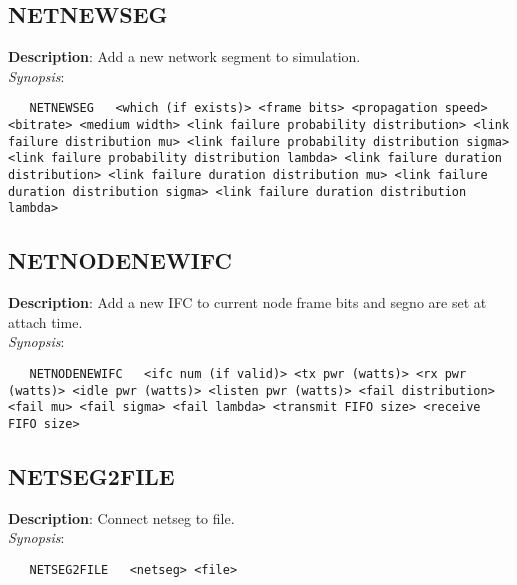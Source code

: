 \subsection{\bf NETNEWSEG}
\label{manpages:NETNEWSEG}
\label{manpages:netnewseg}
\vspace{-0.2in}
{\bf Description}: 	Add a new network segment to simulation.\\[1.5ex]
{\em Synopsis}:
\vspace{-0.2in}
\scriptsize
\begin{verbatim}
   NETNEWSEG   <which (if exists)> <frame bits> <propagation speed> <bitrate> <medium width> <link failure probability distribution> <link failure distribution mu> <link failure probability distribution sigma> <link failure probability distribution lambda> <link failure duration distribution> <link failure duration distribution mu> <link failure duration distribution sigma> <link failure duration distribution lambda>	
\end{verbatim}
\normalsize
\vspace{-0.2in}


\subsection{\bf NETNODENEWIFC}
\label{manpages:NETNODENEWIFC}
\label{manpages:netnodenewifc}
\vspace{-0.2in}
{\bf Description}: 	Add a new IFC to current node frame bits and segno are set at attach time.\\[1.5ex]
{\em Synopsis}:
\vspace{-0.2in}
\scriptsize
\begin{verbatim}
   NETNODENEWIFC   <ifc num (if valid)> <tx pwr (watts)> <rx pwr (watts)> <idle pwr (watts)> <listen pwr (watts)> <fail distribution> <fail mu> <fail sigma> <fail lambda> <transmit FIFO size> <receive FIFO size>
\end{verbatim}
\normalsize
\vspace{-0.2in}


\subsection{\bf NETSEG2FILE}
\label{manpages:NETSEG2FILE}
\label{manpages:netseg2file}
\vspace{-0.2in}
{\bf Description}: 	Connect netseg to file.\\[1.5ex]
{\em Synopsis}:
\vspace{-0.2in}
\scriptsize
\begin{verbatim}
   NETSEG2FILE   <netseg> <file>					
\end{verbatim}
\normalsize
\vspace{-0.2in}


